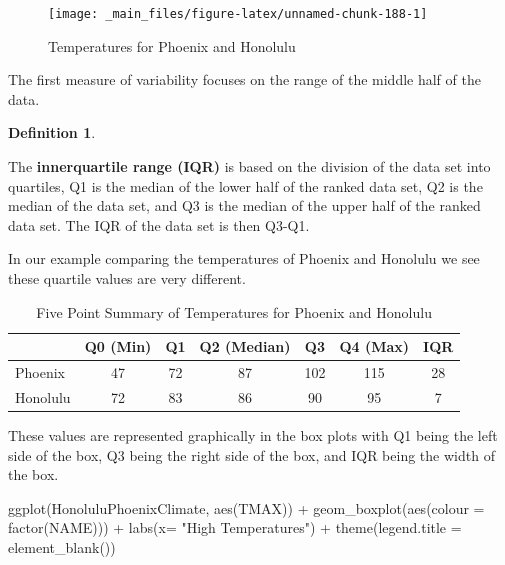 \documentclass[
]{book}
\newenvironment{Shaded}{\begin{snugshade}}{\end{snugshade}}
\newcommand{\AttributeTok}[1]{\textcolor[rgb]{0.77,0.63,0.00}{#1}}
\newcommand{\FunctionTok}[1]{\textcolor[rgb]{0.00,0.00,0.00}{#1}}
\newcommand{\NormalTok}[1]{#1}
\newcommand{\SpecialCharTok}[1]{\textcolor[rgb]{0.00,0.00,0.00}{#1}}
\newcommand{\StringTok}[1]{\textcolor[rgb]{0.31,0.60,0.02}{#1}}
\theoremstyle{definition}
\newtheorem{definition}{Definition}[chapter]
\theoremstyle{definition}
\theoremstyle{definition}
\theoremstyle{definition}
\theoremstyle{remark}
\begin{document}
\begin{figure}

{\centering \texttt{[image: \_main\_files/figure-latex/unnamed-chunk-188-1]} 

}

\caption{Temperatures for Phoenix and Honolulu}\label{fig:unnamed-chunk-188}
\end{figure}

The first measure of variability focuses on the range of the middle half of the data.

\begin{definition}
\protect\hypertarget{def:unlabeled-div-298}{}\label{def:unlabeled-div-298}

The \textbf{innerquartile range (IQR)} is based on the division of the data set into quartiles, Q1 is the median of the lower half of the ranked data set, Q2 is the median of the data set, and Q3 is the median of the upper half of the ranked data set. The IQR of the data set is then Q3-Q1.

\end{definition}

In our example comparing the temperatures of Phoenix and Honolulu we see these quartile values are very different.

\begin{table}

\caption{\label{tab:unnamed-chunk-190}Five Point Summary of Temperatures for Phoenix and Honolulu}
\centering
\begin{tabular}[t]{lcccccc}
\toprule
  & Q0 (Min) & Q1 & Q2 (Median) & Q3 & Q4 (Max) & IQR\\
\midrule
Phoenix & 47 & 72 & 87 & 102 & 115 & 28\\
Honolulu & 72 & 83 & 86 & 90 & 95 & 7\\
\bottomrule
\end{tabular}
\end{table}

These values are represented graphically in the box plots with Q1 being the left side of the box, Q3 being the right side of the box, and IQR being the width of the box.

\begin{Shaded}
\begin{Highlighting}[]
\FunctionTok{ggplot}\NormalTok{(HonoluluPhoenixClimate, }\FunctionTok{aes}\NormalTok{(TMAX)) }\SpecialCharTok{+} \FunctionTok{geom\_boxplot}\NormalTok{(}\FunctionTok{aes}\NormalTok{(}\AttributeTok{colour =} \FunctionTok{factor}\NormalTok{(NAME))) }\SpecialCharTok{+} \FunctionTok{labs}\NormalTok{(}\AttributeTok{x=} \StringTok{"High Temperatures"}\NormalTok{) }\SpecialCharTok{+} \FunctionTok{theme}\NormalTok{(}\AttributeTok{legend.title =} \FunctionTok{element\_blank}\NormalTok{())}
\end{Highlighting}
\end{Shaded}
\end{document}
